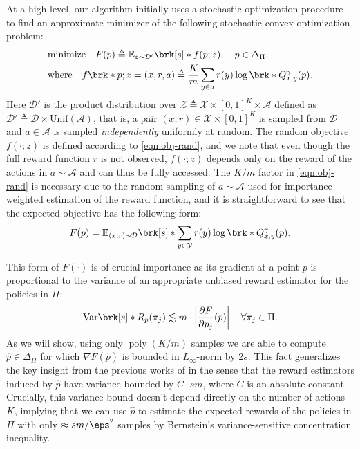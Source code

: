 \documentclass[11pt]{article}
\newcommand{\eqdef}{\triangleq}
\renewcommand{\ind}[1]{\mathds{1}\{#1\}}
\newcommand{\bbE}{\boldsymbol{\mathbb{E}}}
\renewcommand{\E}{\bbE}
\newcommand{\poly}{\operatorname{poly}}
\newcommand{\yprobg}[3]{Q^\gamma_{#2,#3}(#1)}
\newcommand{\pred}{a}
\newcommand{\rew}{r}
\newcommand{\lab}{y}
\newcommand{\calX}{\mathcal{X}}
\newcommand{\calY}{\mathcal{Y}}
\newcommand{\calD}{\mathcal{D}}
\newcommand{\iwd}{\mathcal{D}'}
\newcommand{\calA}{\mathcal{A}}
\newcommand{\calZ}{\mathcal{Z}}
\newcommand{\obj}{F}
\newcommand{\objrand}{f}
\theoremstyle{plain}
\begin{document}
At a high level, our algorithm initially uses a stochastic optimization procedure to find an approximate minimizer of the following stochastic convex optimization problem: 
\begin{align}
\label{eq:phase-1-objective}
    &\mathrm{minimize} \quad \obj(p) \eqdef \E_{z \sim \iwd} \brk[s]*{\objrand(p;z)}, \quad p \in \Delta_\Pi, \\
    \label{eqn:obj-rand}
    &\text{where} \quad f \brk*{p; z=(x,\rew,\pred)} 
                \eqdef
                \frac{K}{m} \sum_{\lab \in \pred} \rew(y) \log \brk*{\yprobg{p}{x}{\lab}}.
\end{align}
Here $\iwd$ is the product distribution over $\calZ \eqdef \calX \times [0,1]^K \times \calA$ defined as $\iwd \eqdef \calD \times \mathrm{Unif}(\calA)$, that is, a pair $(x,r) \in \calX \times [0,1]^K$ is sampled from $\calD$ and $\pred \in \calA$ is sampled \emph{independently} uniformly at random. The random objective $\objrand(\cdot;z)$ is defined according to \cref{eqn:obj-rand}, and we note that even though the full reward function $\rew$ is not observed, $\objrand(\cdot;z)$ depends only on the reward of the actions in $\pred \sim \calA$ and can thus be fully accessed. The $K/m$ factor in \cref{eqn:obj-rand} is necessary due to the random sampling of $\pred \sim \calA$ used for importance-weighted estimation of the reward function, and it is straightforward to see that the expected objective has the following form:
\begin{align}
    \label{eqn:obj-expected}
    \obj(p) = \E_{(x,\rew) \sim \calD} \brk[s]*{\sum_{\lab \in \calY} \rew(\lab) \log \brk*{\yprobg{p}{x}{\lab}}}.
\end{align}

This form of $\obj(\cdot)$ is of crucial importance as its gradient at a point $p$ is proportional to the variance of an appropriate unbiased reward estimator for the policies in $\Pi$:
\begin{align*}
    \mathrm{Var} \brk[s]*{R_p(\pi_j)} \lesssim m \cdot \left| \frac{\partial F}{\partial p_j}(p) \right| \quad \forall \pi_j \in \Pi.
\end{align*}
As we will show, using only $\poly(K/m)$ samples we are able to compute $\hat p \in \Delta_\Pi$ for which $\nabla \obj(\hat p)$ is bounded in $L_\infty$-norm by $2s$. This fact generalizes the key insight from the previous works of \cite{dudik2011efficient,agarwal2014taming,erez2024fast} in the sense that the reward estimators induced by $\hat p$ have variance bounded by $C \cdot sm$, where $C$ is an absolute constant. Crucially, this variance bound doesn't depend directly on the number of actions $K$, implying that we can use $\hat p$ to estimate the expected rewards of the policies in $\Pi$ with only $\approx sm / \eps^2$ samples by Bernstein's variance-sensitive concentration inequality.
\end{document}
